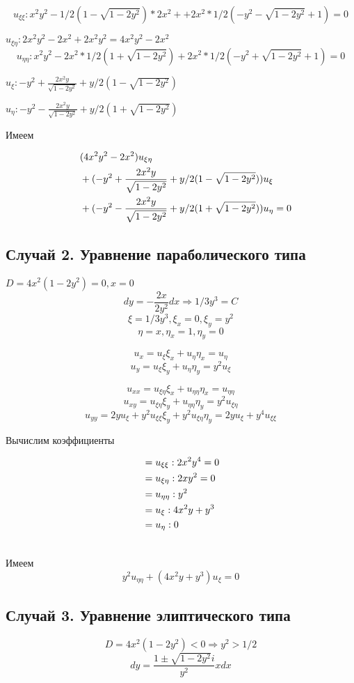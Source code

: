 \documentclass[a4paper,12pt]{article}
\begin{document}
$$u_{\xi\xi} : x^2y^2 - 1/2(1 - \sqrt{1-2y^2})*2x^2 + 
+ 2x^2*1/2(-y^2 - \sqrt{1-2y^2} + 1) = 0$$

$u_{\xi\eta} : 2x^2y^2 - 2x^2 + 2x^2y^2 = 4x^2y^2 - 2x^2$
$$u_{\eta\eta} : x^2y^2 - 2x^2*1/2(1+\sqrt{1-2y^2}) + 2x^2*1/2(-y^2 + \sqrt{1-2y^2} + 1) = 0$$

$u_\xi : -y^2 + \frac{2x^2y}{\sqrt{1-2y^2}} + y/2(1-\sqrt{1-2y^2})$

$u_\eta : -y^2 - \frac{2x^2y}{\sqrt{1-2y^2}} + y/2(1+\sqrt{1-2y^2})$

Имеем

\begin{align}
    &\quad(4x^2y^2 - 2x^2)u_{\xi\eta} \notag \\
    &\quad+ (-y^2 + \frac{2x^2y}{\sqrt{1-2y^2}} + y/2(1-\sqrt{1-2y^2}))u_\xi \notag \\
    &\quad+ (-y^2 - \frac{2x^2y}{\sqrt{1-2y^2}} + y/2(1+\sqrt{1-2y^2}))u_\eta = 0
\end{align}

\subsection{Случай 2. Уравнение параболического типа}
$D = 4x^2(1-2y^2) = 0, x = 0$
$$dy = -\frac{2x}{2y^2}dx \Rightarrow 1/3y^3 = C$$
$$\xi = 1/3y^3, \xi_x = 0, \xi_y = y^2$$
$$\eta = x, \eta_x = 1, \eta_y = 0$$

$$u_x = u_\xi\xi_x + u_\eta\eta_x = u_\eta$$
$$u_y = u_\xi\xi_y + u_\eta\eta_y = y^2u_\xi$$

$$u_{xx} = u_{\xi\eta}\xi_x + u_{\eta\eta}\eta_x = u_{\eta\eta}$$
$$u_{xy} = u_{\xi\eta}\xi_y + u_{\eta\eta}\eta_y = y^2u_{\xi\eta}$$
$$u_{yy} = 2yu_\xi + y^2u_{\xi\xi}\xi_y + y^2u_{\xi\eta}\eta_y = 2yu_\xi + y^4u_{\xi\xi}$$

Вычислим коэффициенты

\begin{align}
&=u_{\xi\xi} : 2x^2y^4 = 0 \\ \notag
&=u_{\xi\eta}: 2xy^2 = 0 \\ \notag
&=u_{\eta\eta}: y^2 \\ \notag
&=u_\xi: 4x^2y + y^3 \\ \notag
&=u_\eta: 0 \\ \notag
\end{align}

Имеем
$$y^2u_{\eta\eta} + (4x^2y + y^3)u_\xi = 0$$


\subsection{Случай 3. Уравнение элиптического типа}
$$D = 4x^2(1-2y^2) < 0 \Rightarrow y^2 > 1/2$$
$$dy = \frac{1 \pm \sqrt{1-2y^2}i}{y^2}xdx$$
\end{document}
